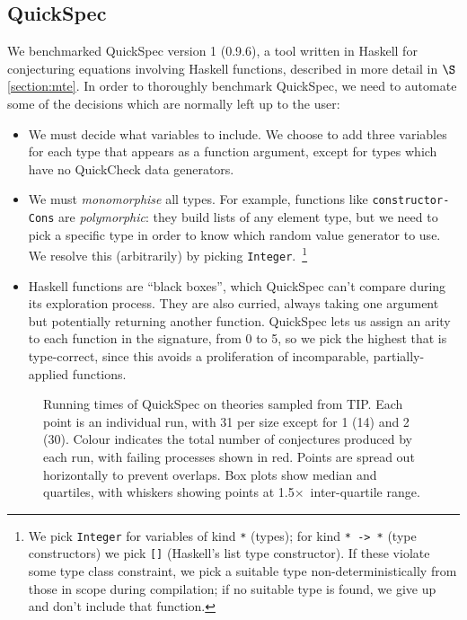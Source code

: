 \subsection{QuickSpec}

We benchmarked QuickSpec version 1 (0.9.6), a tool written in Haskell for
conjecturing equations involving Haskell functions, described in more detail in
$\S$\ref{section:mte}. In order to thoroughly benchmark QuickSpec, we need
to automate some of the decisions which are normally left up to the user:

\begin{sloppypar}
  \begin{itemize}
  \item We must decide what variables to include. We choose to add three
    variables for each type that appears as a function argument, except for
    types which have no QuickCheck data generators.
  \item We must \emph{monomorphise} all types. For example, functions like
    \texttt{constructor-Cons} are \emph{polymorphic}: they build lists of any
    element type, but we need to pick a specific type in order to know which
    random value generator to use. We resolve this (arbitrarily) by picking
    \texttt{Integer}.~\footnote{We pick \texttt{Integer} for variables of kind
      \texttt{*} (types); for kind \texttt{* -> *} (type constructors) we pick
      \texttt{[]} (Haskell's list type constructor). If these violate some
      type class constraint, we pick a suitable type non-deterministically from
      those in scope during compilation; if no suitable type is found, we give
      up and don't include that function.}
  \item Haskell functions are ``black boxes'', which QuickSpec can't compare
    during its exploration process. They are also curried, always taking one
    argument but potentially returning another function. QuickSpec lets us
    assign an arity to each function in the signature, from 0 to 5, so we pick
    the highest that is type-correct, since this avoids a proliferation of
    incomparable, partially-applied functions.
  \end{itemize}
\end{sloppypar}

\begin{figure}
  \centering
  
  \caption{Running times of QuickSpec on theories sampled from TIP. Each point
    is an individual run, with 31 per size except for 1 (14) and 2 (30). Colour
    indicates the total number of conjectures produced by each run, with failing
    processes shown in red. Points are spread out horizontally to prevent
    overlaps. Box plots show median and quartiles, with whiskers showing points
    at 1.5$\times$~inter-quartile range.}
  \label{figure:quickspec_runtimes}
\end{figure}

